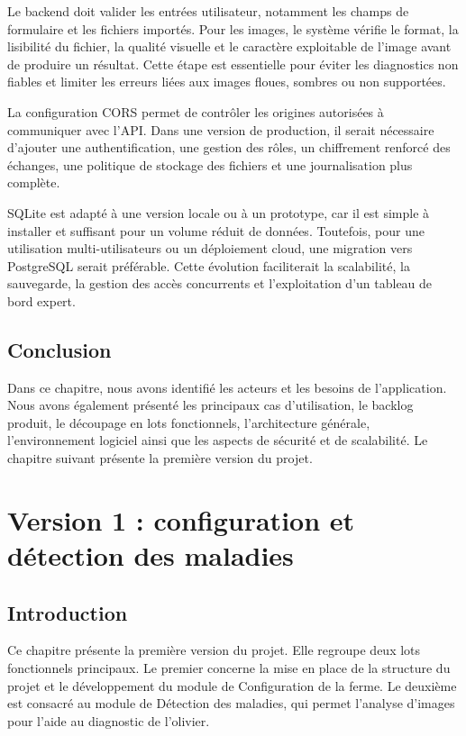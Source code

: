 \documentclass[12pt,a4paper]{report}
\begin{document}
Le backend doit valider les entrées utilisateur, notamment les champs de formulaire et les fichiers importés. Pour les images, le système vérifie le format, la lisibilité du fichier, la qualité visuelle et le caractère exploitable de l'image avant de produire un résultat. Cette étape est essentielle pour éviter les diagnostics non fiables et limiter les erreurs liées aux images floues, sombres ou non supportées.

La configuration CORS permet de contrôler les origines autorisées à communiquer avec l'API. Dans une version de production, il serait nécessaire d'ajouter une authentification, une gestion des rôles, un chiffrement renforcé des échanges, une politique de stockage des fichiers et une journalisation plus complète.

SQLite est adapté à une version locale ou à un prototype, car il est simple à installer et suffisant pour un volume réduit de données. Toutefois, pour une utilisation multi-utilisateurs ou un déploiement cloud, une migration vers PostgreSQL serait préférable. Cette évolution faciliterait la scalabilité, la sauvegarde, la gestion des accès concurrents et l'exploitation d'un tableau de bord expert.

\section{Conclusion}

Dans ce chapitre, nous avons identifié les acteurs et les besoins de l'application. Nous avons également présenté les principaux cas d'utilisation, le backlog produit, le découpage en lots fonctionnels, l'architecture générale, l'environnement logiciel ainsi que les aspects de sécurité et de scalabilité. Le chapitre suivant présente la première version du projet.

\chapter{Version 1 : configuration et détection des maladies}

\section{Introduction}

Ce chapitre présente la première version du projet. Elle regroupe deux lots fonctionnels principaux. Le premier concerne la mise en place de la structure du projet et le développement du module de Configuration de la ferme. Le deuxième est consacré au module de Détection des maladies, qui permet l'analyse d'images pour l'aide au diagnostic de l'olivier.
\end{document}
